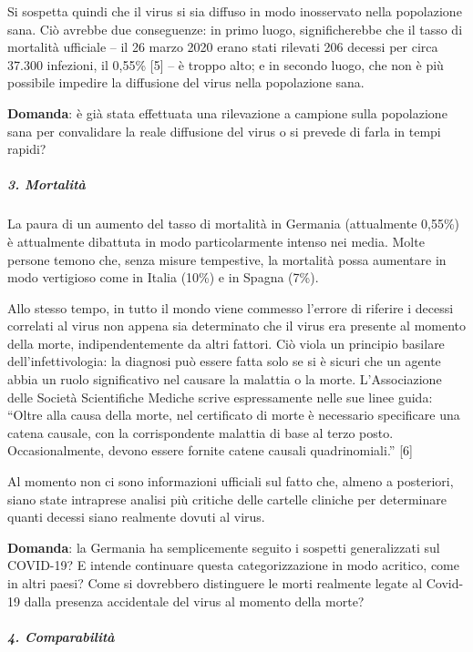Si sospetta quindi che il virus si sia diffuso in modo inosservato nella
popolazione sana. Ciò avrebbe due conseguenze: in primo luogo,
significherebbe che il tasso di mortalità ufficiale -- il 26 marzo 2020
erano stati rilevati 206 decessi per circa 37.300 infezioni, il 0,55\%
{[}5{]} -- è troppo alto; e in secondo luogo, che non è più possibile
impedire la diffusione del virus nella popolazione sana.

\textbf{Domanda}: è già stata effettuata una rilevazione a campione
sulla popolazione sana per convalidare la reale diffusione del virus o
si prevede di farla in tempi rapidi?

\hypertarget{3-mortalituxe0}{%
\subparagraph{\texorpdfstring{\textbf{3.
Mortalità}}{3. Mortalità}}\label{3-mortalituxe0}}

La paura di un aumento del tasso di mortalità in Germania (attualmente
0,55\%) è attualmente dibattuta in modo particolarmente intenso nei
media. Molte persone temono che, senza misure tempestive, la mortalità
possa aumentare in modo vertigioso come in Italia (10\%) e in Spagna
(7\%).

Allo stesso tempo, in tutto il mondo viene commesso l'errore di riferire
i decessi correlati al virus non appena sia determinato che il virus era
presente al momento della morte, indipendentemente da altri fattori. Ciò
viola un principio basilare dell'infettivologia: la diagnosi può essere
fatta solo se si è sicuri che un agente abbia un ruolo significativo nel
causare la malattia o la morte. L'Associazione delle Società
Scientifiche Mediche scrive espressamente nelle sue linee guida: ``Oltre
alla causa della morte, nel certificato di morte è necessario
specificare una catena causale, con la corrispondente malattia di base
al terzo posto. Occasionalmente, devono essere fornite catene causali
quadrinomiali.'' {[}6{]}

Al momento non ci sono informazioni ufficiali sul fatto che, almeno a
posteriori, siano state intraprese analisi più critiche delle cartelle
cliniche per determinare quanti decessi siano realmente dovuti al virus.

\textbf{Domanda}: la Germania ha semplicemente seguito i sospetti
generalizzati sul COVID-19? E intende continuare questa categorizzazione
in modo acritico, come in altri paesi? Come si dovrebbero distinguere le
morti realmente legate al Covid-19 dalla presenza accidentale del virus
al momento della morte?

\hypertarget{4-comparabilituxe0}{%
\subparagraph{\texorpdfstring{\textbf{4.
Comparabilità}}{4. Comparabilità}}\label{4-comparabilituxe0}}

